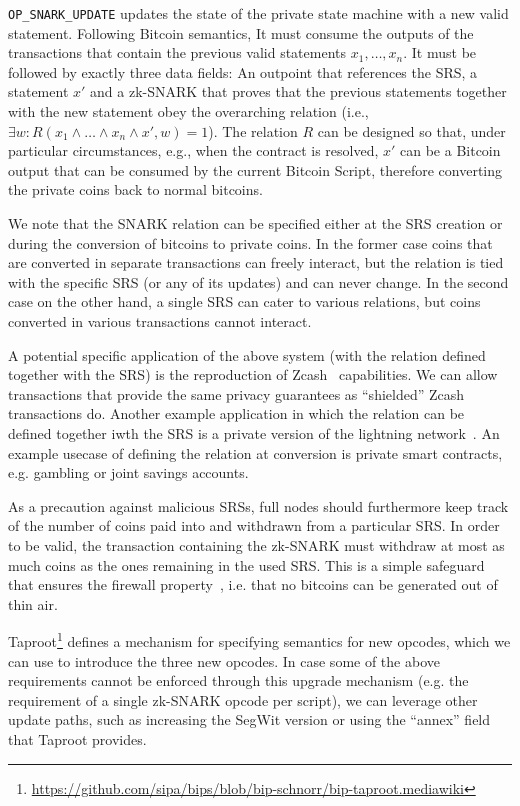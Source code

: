  \texttt{OP\_SNARK\_UPDATE} updates the state of the private state machine with
  a new valid statement. Following Bitcoin semantics, It must consume the
  outputs of the transactions that contain the previous valid statements $x_1,
  \dots, x_n$. It must be followed by exactly three data fields: An outpoint
  that references the SRS, a statement $x'$ and a zk-SNARK that proves that the
  previous statements together with the new statement obey the overarching
  relation (i.e., $\exists w: R(x_1 \wedge \dots \wedge x_n \wedge x', w) = 1$).
  The relation $R$ can be designed so that, under particular circumstances,
  e.g., when the contract is resolved, $x'$ can be a Bitcoin output that can be
  consumed by the current Bitcoin Script, therefore converting the private coins
  back to normal bitcoins.

  We note that the SNARK relation can be specified either at the SRS creation or
  during the conversion of bitcoins to private coins. In the former case coins
  that are converted in separate transactions can freely interact, but the
  relation is tied with the specific SRS (or any of its updates) and can never
  change. In the second case on the other hand, a single SRS can cater to
  various relations, but coins converted in various transactions cannot
  interact.

  A potential specific application of the above system (with the relation
  defined together with the SRS) is the reproduction of
  Zcash~\cite{DBLP:conf/sp/Ben-SassonCG0MTV14,zcash-protocol} capabilities. We
  can allow transactions that provide the same privacy guarantees as
  ``shielded'' Zcash transactions do. Another example application in which the
  relation can be defined together iwth the SRS is a private version of the
  lightning network~\cite{lightning}. An example usecase of defining the
  relation at conversion is private smart contracts, e.g. gambling or joint
  savings accounts.

  As a precaution against malicious SRSs, full nodes should furthermore keep
  track of the number of coins paid into and withdrawn from a particular SRS. In
  order to be valid, the transaction containing the zk-SNARK must withdraw at
  most as much coins as the ones remaining in the used SRS. This is a simple
  safeguard that ensures the firewall property~\cite{DBLP:conf/sp/GaziKZ19},
  i.e. that no bitcoins can be generated out of thin air.

  Taproot\footnote{\url{https://github.com/sipa/bips/blob/bip-schnorr/bip-taproot.mediawiki}}
  defines a mechanism for specifying semantics for new opcodes, which we can use
  to introduce the three new opcodes. In case some of the above requirements
  cannot be enforced through this upgrade mechanism (e.g. the requirement of a
  single zk-SNARK opcode per script), we can leverage other update paths, such
  as increasing the SegWit version or using the ``annex'' field that Taproot
  provides.

